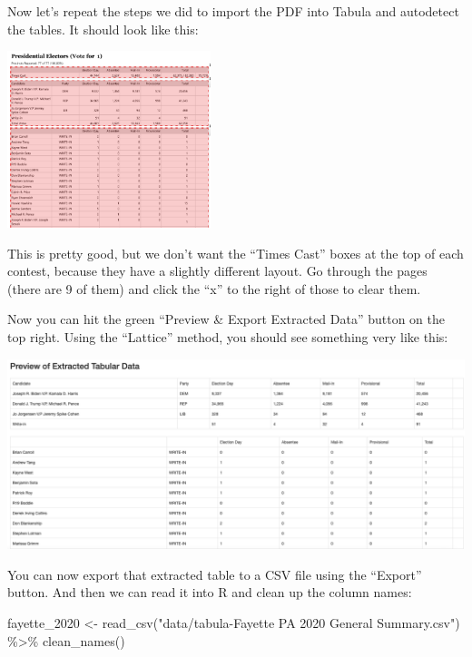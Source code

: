 \documentclass[
  letterpaper,
  DIV=11,
  numbers=noendperiod]{scrreprt}
\newenvironment{Shaded}{\begin{snugshade}}{\end{snugshade}}
\newcommand{\FunctionTok}[1]{\textcolor[rgb]{0.28,0.35,0.67}{#1}}
\newcommand{\NormalTok}[1]{\textcolor[rgb]{0.00,0.23,0.31}{#1}}
\newcommand{\OtherTok}[1]{\textcolor[rgb]{0.00,0.23,0.31}{#1}}
\newcommand{\SpecialCharTok}[1]{\textcolor[rgb]{0.37,0.37,0.37}{#1}}
\newcommand{\StringTok}[1]{\textcolor[rgb]{0.13,0.47,0.30}{#1}}
\begin{document}
Now let's repeat the steps we did to import the PDF into Tabula and
autodetect the tables. It should look like this:

\includegraphics[width=2.33in,height=\textheight]{./images/fayette_2.png}

This is pretty good, but we don't want the ``Times Cast'' boxes at the
top of each contest, because they have a slightly different layout. Go
through the pages (there are 9 of them) and click the ``x'' to the right
of those to clear them.

Now you can hit the green ``Preview \& Export Extracted Data'' button on
the top right. Using the ``Lattice'' method, you should see something
very like this:

\includegraphics[width=5.54in,height=\textheight]{./images/fayette_3.png}

You can now export that extracted table to a CSV file using the
``Export'' button. And then we can read it into R and clean up the
column names:

\begin{Shaded}
\begin{Highlighting}[]
\NormalTok{fayette\_2020 }\OtherTok{\textless{}{-}} \FunctionTok{read\_csv}\NormalTok{(}\StringTok{"data/tabula{-}Fayette PA 2020 General Summary.csv"}\NormalTok{) }\SpecialCharTok{\%\textgreater{}\%} \FunctionTok{clean\_names}\NormalTok{()}
\end{Highlighting}
\end{Shaded}
\end{document}
